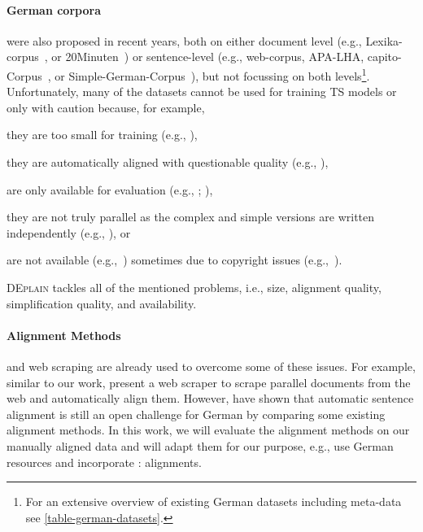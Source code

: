 \documentclass[11pt]{article}
\begin{document}
\paragraph{German corpora} were also proposed in recent years, both on either document level (e.g., Lexika-corpus~\citealt{hewett-stede-2021-automatically}, or 20Minuten~\citealt{rios-etal-2021-new}) or sentence-level (e.g., web-corpus, APA-LHA, capito-Corpus~\citealt{ebling-etal-2022-automatic}, or Simple-German-Corpus~\citealt{toborek-etal-2022-new}), but not focussing on both levels\footnote{For an extensive overview of existing German datasets including meta-data see \autoref{table-german-datasets}.}. Unfortunately, many of the datasets cannot be used for training TS models or only with caution because, for example, 
\begin{enumerate*}[label=\roman*)]
    \item they are too small for training (e.g., \citet{klaper-etal-2013-building}), 
    \item they are automatically aligned with questionable quality (e.g., \citealt{spring-etal-2021-exploring}), 
    \item are only available for evaluation (e.g., \citealt{mallinson-etal-2020-zero}; \citealt{naderi-etal-2019-subjective}),
    \item they are not truly parallel as the complex and simple versions are written independently (e.g., \citealt{aumiller-gertz-2022-klexikon}), or
    \item are not available (e.g.,~\citealt{ebling-etal-2022-automatic}) sometimes due to copyright issues (e.g.,~\citealt{battisti-etal-2020-corpus}). 
\end{enumerate*}
\textsc{DEplain} tackles  all of the mentioned problems, i.e., size, alignment quality, simplification quality, and availability.



\paragraph{Alignment Methods} and web scraping are already used to overcome some of these issues. For example, similar to our work, \citet{toborek-etal-2022-new} present a web scraper to scrape parallel  documents from the web and automatically align them. However, \cite{spring-etal-2022-ensembling} have shown that automatic sentence alignment is still an open challenge for German by comparing some existing alignment methods.
In this work, we will evaluate the alignment methods on our manually aligned data and will adapt them for our purpose, e.g., use German resources and incorporate : alignments. \par 
\end{document}
